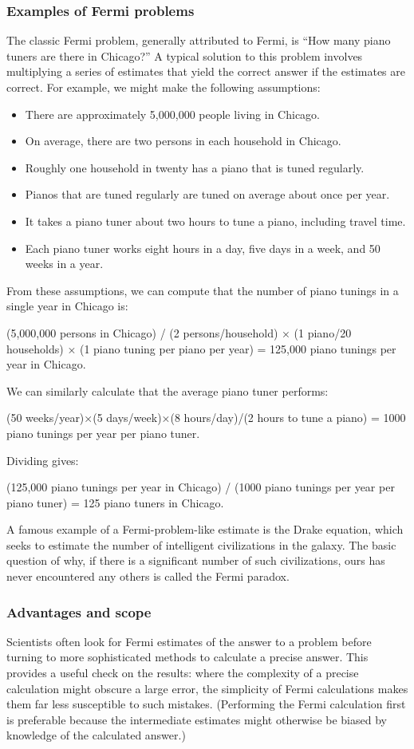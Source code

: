 \subsubsection{Examples of Fermi problems}
The classic Fermi problem, generally attributed to Fermi, is ``How many piano tuners are there in Chicago?'' A typical solution to this problem involves multiplying a series of estimates that yield the correct answer if the estimates are correct. For example, we might make the following assumptions:
\begin{itemize}
\item There are approximately 5,000,000 people living in Chicago.
\item On average, there are two persons in each household in Chicago.
\item Roughly one household in twenty has a piano that is tuned regularly.
\item Pianos that are tuned regularly are tuned on average about once per year.
\item It takes a piano tuner about two hours to tune a piano, including travel time.
\item Each piano tuner works eight hours in a day, five days in a week, and 50 weeks in a year.
\end{itemize}
From these assumptions, we can compute that the number of piano tunings in a single year in Chicago is:

(5,000,000 persons in Chicago) / (2 persons/household) × (1 piano/20 households) × (1 piano tuning per piano per year) = 125,000 piano tunings per year in Chicago.

We can similarly calculate that the average piano tuner performs:

(50 weeks/year)×(5 days/week)×(8 hours/day)/(2 hours to tune a piano) = 1000 piano tunings per year per piano tuner.

Dividing gives:

(125,000 piano tunings per year in Chicago) / (1000 piano tunings per year per piano tuner) = 125 piano tuners in Chicago.

A famous example of a Fermi-problem-like estimate is the Drake equation, which seeks to estimate the number of intelligent civilizations in the galaxy. The basic question of why, if there is a significant number of such civilizations, ours has never encountered any others is called the Fermi paradox.


\subsubsection{Advantages and scope}
Scientists often look for Fermi estimates of the answer to a problem before turning to more sophisticated methods to calculate a precise answer. This provides a useful check on the results: where the complexity of a precise calculation might obscure a large error, the simplicity of Fermi calculations makes them far less susceptible to such mistakes. (Performing the Fermi calculation first is preferable because the intermediate estimates might otherwise be biased by knowledge of the calculated answer.)

